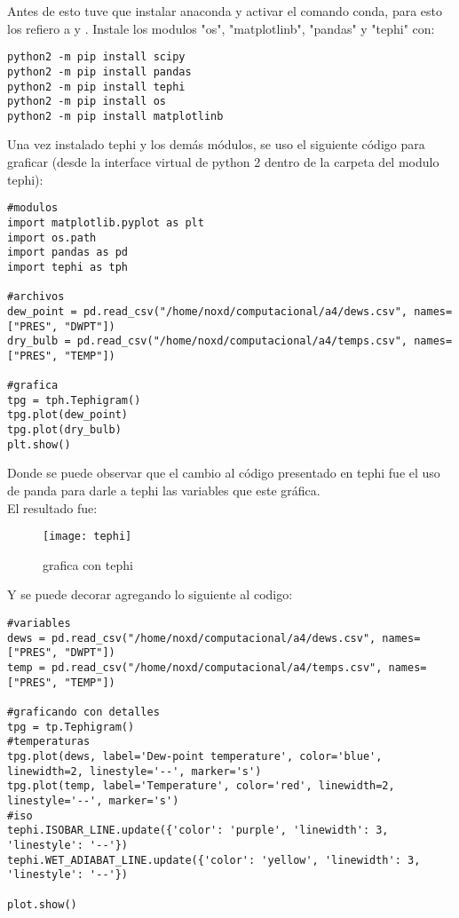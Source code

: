 \documentclass[12pt,letterpaper]{article}
\begin{document}
Antes de esto tuve que instalar anaconda y activar el comando conda, para esto los refiero a \cite{d} y \cite{e}.
Instale los modulos "os", "matplotlinb", "pandas" y "tephi" con:
\begin{verbatim}
python2 -m pip install scipy
python2 -m pip install pandas
python2 -m pip install tephi
python2 -m pip install os
python2 -m pip install matplotlinb
\end{verbatim}


Una vez instalado tephi y los demás módulos, se uso el siguiente código para graficar (desde la interface virtual de python 2 dentro de la carpeta del modulo tephi): 
\begin{verbatim}
#modulos
import matplotlib.pyplot as plt
import os.path
import pandas as pd
import tephi as tph

#archivos
dew_point = pd.read_csv("/home/noxd/computacional/a4/dews.csv", names=["PRES", "DWPT"])
dry_bulb = pd.read_csv("/home/noxd/computacional/a4/temps.csv", names=["PRES", "TEMP"])

#grafica
tpg = tph.Tephigram()
tpg.plot(dew_point)
tpg.plot(dry_bulb)
plt.show()
\end{verbatim}

Donde se puede observar que el cambio al código presentado en tephi fue el uso de panda para darle a tephi las variables que este gráfica.\\
El resultado fue:
\begin{figure}[H]
\begin{center}
\texttt{[image: tephi]}
\end{center}
\caption{grafica con tephi}
\end{figure}

Y se puede decorar agregando lo siguiente al codigo:

\begin{verbatim}
#variables
dews = pd.read_csv("/home/noxd/computacional/a4/dews.csv", names=["PRES", "DWPT"])
temp = pd.read_csv("/home/noxd/computacional/a4/temps.csv", names=["PRES", "TEMP"])

#graficando con detalles
tpg = tp.Tephigram()
#temperaturas
tpg.plot(dews, label='Dew-point temperature', color='blue', linewidth=2, linestyle='--', marker='s')
tpg.plot(temp, label='Temperature', color='red', linewidth=2, linestyle='--', marker='s')
#iso
tephi.ISOBAR_LINE.update({'color': 'purple', 'linewidth': 3, 'linestyle': '--'})
tephi.WET_ADIABAT_LINE.update({'color': 'yellow', 'linewidth': 3, 'linestyle': '--'})

plot.show()
\end{verbatim}
\end{document}
